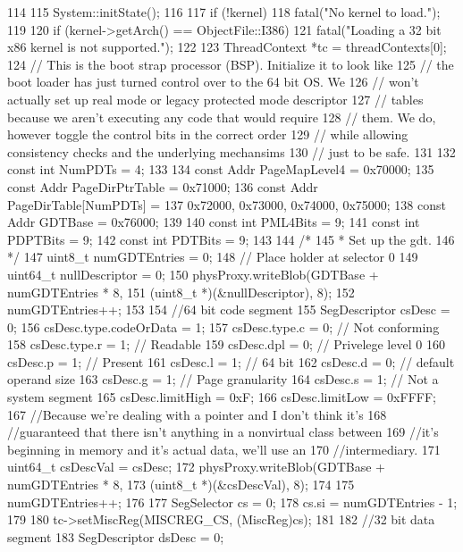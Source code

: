 \begin{DoxyCode}
114 {
115     System::initState();
116 
117     if (!kernel)
118         fatal("No kernel to load.\n");
119 
120     if (kernel->getArch() == ObjectFile::I386)
121         fatal("Loading a 32 bit x86 kernel is not supported.\n");
122 
123     ThreadContext *tc = threadContexts[0];
124     // This is the boot strap processor (BSP). Initialize it to look like
125     // the boot loader has just turned control over to the 64 bit OS. We
126     // won't actually set up real mode or legacy protected mode descriptor
127     // tables because we aren't executing any code that would require
128     // them. We do, however toggle the control bits in the correct order
129     // while allowing consistency checks and the underlying mechansims
130     // just to be safe.
131 
132     const int NumPDTs = 4;
133 
134     const Addr PageMapLevel4 = 0x70000;
135     const Addr PageDirPtrTable = 0x71000;
136     const Addr PageDirTable[NumPDTs] =
137         {0x72000, 0x73000, 0x74000, 0x75000};
138     const Addr GDTBase = 0x76000;
139 
140     const int PML4Bits = 9;
141     const int PDPTBits = 9;
142     const int PDTBits = 9;
143 
144     /*
145      * Set up the gdt.
146      */
147     uint8_t numGDTEntries = 0;
148     // Place holder at selector 0
149     uint64_t nullDescriptor = 0;
150     physProxy.writeBlob(GDTBase + numGDTEntries * 8,
151                         (uint8_t *)(&nullDescriptor), 8);
152     numGDTEntries++;
153 
154     //64 bit code segment
155     SegDescriptor csDesc = 0;
156     csDesc.type.codeOrData = 1;
157     csDesc.type.c = 0; // Not conforming
158     csDesc.type.r = 1; // Readable
159     csDesc.dpl = 0; // Privelege level 0
160     csDesc.p = 1; // Present
161     csDesc.l = 1; // 64 bit
162     csDesc.d = 0; // default operand size
163     csDesc.g = 1; // Page granularity
164     csDesc.s = 1; // Not a system segment
165     csDesc.limitHigh = 0xF;
166     csDesc.limitLow = 0xFFFF;
167     //Because we're dealing with a pointer and I don't think it's
168     //guaranteed that there isn't anything in a nonvirtual class between
169     //it's beginning in memory and it's actual data, we'll use an
170     //intermediary.
171     uint64_t csDescVal = csDesc;
172     physProxy.writeBlob(GDTBase + numGDTEntries * 8,
173                         (uint8_t *)(&csDescVal), 8);
174 
175     numGDTEntries++;
176 
177     SegSelector cs = 0;
178     cs.si = numGDTEntries - 1;
179 
180     tc->setMiscReg(MISCREG_CS, (MiscReg)cs);
181 
182     //32 bit data segment
183     SegDescriptor dsDesc = 0;
}
\end{DoxyCode}
